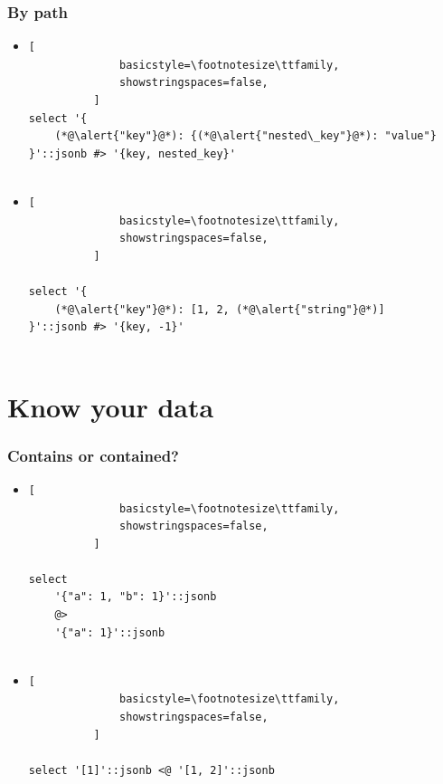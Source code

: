 \documentclass[14pt, compress, aspectratio=169]{beamer}
\begin{document}
\begin{frame}[fragile]
  \frametitle{By path}

  \begin{itemize}
      \item
          \begin{lstlisting}[
              basicstyle=\footnotesize\ttfamily,
              showstringspaces=false,
          ]
select '{
    (*@\alert{"key"}@*): {(*@\alert{"nested\_key"}@*): "value"}
}'::jsonb #> '{key, nested_key}'
         
          \end{lstlisting}

      \item
          \begin{lstlisting}[
              basicstyle=\footnotesize\ttfamily,
              showstringspaces=false,
          ]

select '{
    (*@\alert{"key"}@*): [1, 2, (*@\alert{"string"}@*)]
}'::jsonb #> '{key, -1}'
         
          \end{lstlisting}

  \end{itemize}

\end{frame}

\section{Know your data}

\begin{frame}[fragile]
  \frametitle{Contains or contained?}

  \begin{itemize}
      \item
          \begin{lstlisting}[
              basicstyle=\footnotesize\ttfamily,
              showstringspaces=false,
          ]

select
    '{"a": 1, "b": 1}'::jsonb
    @>
    '{"a": 1}'::jsonb
         
          \end{lstlisting}

      \item
          \begin{lstlisting}[
              basicstyle=\footnotesize\ttfamily,
              showstringspaces=false,
          ]

select '[1]'::jsonb <@ '[1, 2]'::jsonb
         
          \end{lstlisting}


  \end{itemize}

\end{frame}
\end{document}
